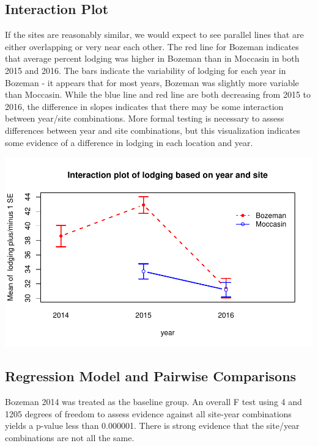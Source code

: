 \documentclass[11pt]{article}\usepackage[]{graphicx}\usepackage[]{color}
\makeatletter
\def\maxwidth{ %
  \ifdim\Gin@nat@width>\linewidth
    \linewidth
  \else
    \Gin@nat@width
  \fi
}
\newenvironment{knitrout}{}{} %
\makeatother
\begin{document}
\subsection{Interaction Plot}
If the sites are reasonably similar, we would expect to see parallel lines that are either overlapping or very near each other.  The red line for Bozeman indicates that average percent lodging was higher in Bozeman than in Moccasin in both 2015 and 2016.  The bars indicate the variability of lodging for each year in Bozeman - it appears that for most years, Bozeman was slightly more variable than Moccasin. While the blue line and red line are both decreasing from 2015 to 2016, the difference in slopes indicates that there may be some interaction between year/site combinations.  More formal testing is necessary to assess differences between year and site combinations, but this visualization indicates some evidence of a difference in lodging in each location and year.
\begin{knitrout}\footnotesize
{}\color{fgcolor}

{\centering \includegraphics[width=\maxwidth]{figure/tables-1} 

}



\end{knitrout}

\pagebreak
\subsection{Regression Model and Pairwise Comparisons}
Bozeman 2014 was treated as the baseline group. An overall F test using 4 and 1205 degrees of freedom to assess evidence against all site-year combinations yields a p-value less than 0.000001. There is strong evidence that the site/year combinations are not all the same. 
  
\end{document}
